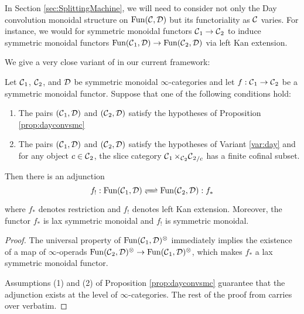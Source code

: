 In Section \ref{sec:SplittingMachine}, we will need to consider not only the Day convolution monoidal structure on $\Fun(\C,\D)$ but its functoriality as $\C$ varies.  For instance, we would for symmetric monoidal functors $\C_1 \to \C_2$ to induce symmetric monoidal functors $\Fun(\C_1,\D) \to \Fun(\C_2,\D)$ via left Kan extension.  

We give a very close variant of \cite[Corollary 3.8]{Nikolaus} in our current framework:

\begin{prop}\label{prop:kanmonoidal}
Let $\C_1$, $\C_2$, and $\D$ be symmetric monoidal $\infty$-categories and let $f:\C_1 \to \C_2$ be a symmetric monoidal functor.  Suppose that one of the following conditions hold:
\begin{enumerate}
\item The pairs $(\C_1, \D)$ and $(\C_2, \D)$ satisfy the hypotheses of Proposition \ref{prop:dayconvsmc}
\item The pairs $(\C_1, \D)$ and $(\C_2, \D)$ satisfy the hypotheses of Variant \ref{var:day} and for any object $c\in \C_2$, the slice category $\C_1 \times_{\C_2} {\C_2}_{/c}$ has a finite cofinal subset.  
\end{enumerate}
   Then there is an adjunction 
$$ f_! : \Fun(\C_1, \D) \xrightleftharpoons{\quad} \Fun(\C_2, \D): f_* $$ %
where $f_*$ denotes restriction and $f_!$ denotes left Kan extension.  Moreover, the functor $f_*$ is lax symmetric monoidal and $f_!$ is symmetric monoidal.  
\end{prop}
\begin{proof}
The universal property of $\Fun(\C_1, \D)^{\otimes}$ immediately implies the existence of a map of $\infty$-operads $\Fun(\C_2,\D)^{\otimes} \to \Fun(\C_1,\D)^{\otimes}$, which makes $f_*$ a lax symmetric monoidal functor.  

Assumptions (1) and (2) of Proposition \ref{prop:dayconvsmc} guarantee that the adjunction exists at the level of $\infty$-categories.  The rest of the proof from \cite[Corollary 3.8]{Nikolaus} carries over verbatim.  
\end{proof}


